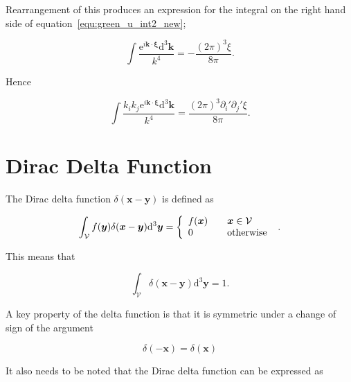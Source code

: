 \documentclass[12pt]{article}
\begin{document}
Rearrangement of this produces an expression for the integral on the right hand side of equation~\ref{equ:green_u_int2_new};

\begin{equation}
\label{equ:green_u_int2_new_express}
\int \frac{\mathrm{e}^{i \boldsymbol{k} \cdot \boldsymbol{\xi}} \mathrm{d}^{3} \boldsymbol{k}}{k^{4}} = -\frac{(2 \pi)^{3} \xi}{8 \pi} .
\end{equation}

Hence

\begin{equation}
\label{equ:green_u_int2}
\int \frac{k_{i} k_{j} \mathrm{e}^{i \boldsymbol{k} \cdot \boldsymbol{\xi}} \mathrm{d}^{3} \boldsymbol{k}}{k^{4}} = \frac{(2 \pi)^{3} \partial_{i}' \partial_{j}' \xi}{8 \pi} .
\end{equation}

\section{Dirac Delta Function}
\label{app:delta}

The Dirac delta function $\delta(\boldsymbol{x} - \boldsymbol{y})$ is defined as \citep{Riley06}

\begin{equation}
\label{equ:dirac}
\int_{\mathcal{V}} f(\boldsymbol{y}) \delta(\boldsymbol{x} - \boldsymbol{y}) \mathrm{d}^{3} \boldsymbol{y} = \left\{
    \begin{array}{l l}
      f(\boldsymbol{x}) &\quad \boldsymbol{x} \in \mathcal{V} \\
      0 & \quad \text{otherwise}
\end{array}
\right.\ .
\end{equation}

This means that

\begin{equation}
\label{equ:delta_int}
\int_{\mathcal{V}} \delta(\boldsymbol{x} - \boldsymbol{y}) \mathrm{d}^{3} \boldsymbol{y} = 1 .
\end{equation}

A key property of the delta function is that it is symmetric under a change of sign of the argument

\begin{equation}
\label{equ:delta_sym}
\delta(-\boldsymbol{x}) = \delta(\boldsymbol{x})
\end{equation}

It also needs to be noted that the Dirac delta function can be expressed as \citep{Riley06}
\end{document}

